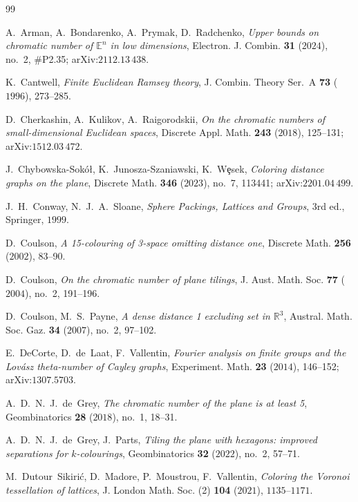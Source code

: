 \documentclass[11pt]{article}
\theoremstyle{definition}
\theoremstyle{remark}
\newcommand{\R}{\mathbb{R}}
\newcommand{\E}{\mathbb{E}}
\begin{document}
\begin{thebibliography}{99}\small

 A.~Arman, A.~Bondarenko, A.~Prymak, D.~Radchenko,
\emph{Upper bounds on chromatic number of $\E^n$ in low dimensions},
Electron. J. Combin. \textbf{31} ($2024$), no.~2, \#P2.35; arXiv:$2112$.$13\,438$.

 K.~Cantwell,
\emph{Finite Euclidean Ramsey theory},
J. Combin. Theory Ser.~A \textbf{73} ($1996$), 273--285.

 D.~Cherkashin, A.~Kulikov, A.~Raigorodskii,
\emph{On the chromatic numbers of small-dimensional Euclidean spaces},
Discrete Appl. Math. \textbf{243} ($2018$), 125--131; arXiv:$1512$.$03\,472$.

 J.~Chybowska-Sok\'o\l{}, K.~Junosza-Szaniawski, K.~W\c{e}sek,
\emph{Coloring distance graphs on the plane},
Discrete Math. \textbf{346} ($2023$), no.~7, 113441;
arXiv:$2201$.$04\,499$.

 J.~H.~Conway, N.~J.~A.~Sloane,
\emph{Sphere Packings, Lattices and Groups}, 3rd ed., Springer, $1999$.

 D.~Coulson,
\emph{A 15-colouring of 3-space omitting distance one},
Discrete Math. \textbf{256} ($2002$), 83--90.

 D.~Coulson,
\emph{On the chromatic number of plane tilings},
J. Aust. Math. Soc. \textbf{77} ($2004$), no.~2, 191--196.

 D.~Coulson, M.~S.~Payne,
\emph{A dense distance 1 excluding set in $\R^3$},
Austral. Math. Soc. Gaz. \textbf{34} ($2007$), no.~2, 97--102.

 E.~DeCorte, D.~de~Laat, F.~Vallentin,
\emph{Fourier analysis on finite groups and the Lov\'asz theta-number of
Cayley graphs},
Experiment. Math. \textbf{23} ($2014$), 146--152; arXiv:$1307$.$5703$.

 A.~D.~N.~J.~de~Grey,
\emph{The chromatic number of the plane is at least 5},
Geombinatorics \textbf{28} ($2018$), no.~1, 18--31.

 A.~D.~N.~J.~de~Grey, J.~Parts,
\emph{Tiling the plane with hexagons: improved separations for
$k$-colourings},
Geombinatorics \textbf{32} ($2022$), no.~2, 57--71.

 M.~Dutour~Sikiri\'c, D.~Madore, P.~Moustrou, F.~Vallentin,
\emph{Coloring the Voronoi tessellation of lattices},
J. London Math. Soc. (2) \textbf{104} ($2021$), $1135$--$1171$.


\end{thebibliography}
\end{document}
